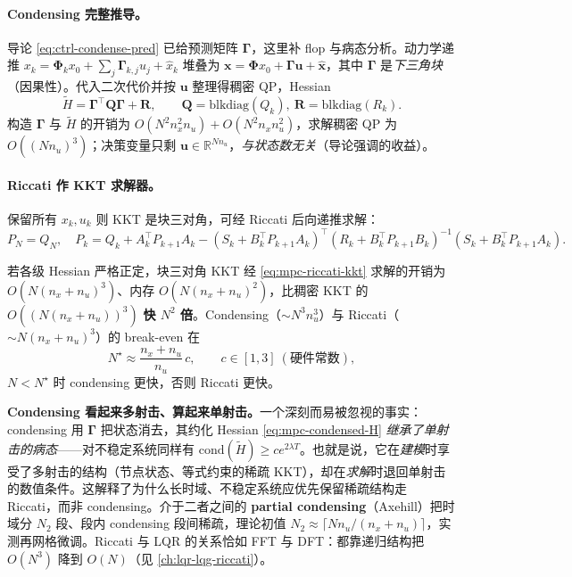 \paragraph{Condensing 完整推导。}
导论 \cref{eq:ctrl-condense-pred} 已给预测矩阵 $\boldsymbol\Gamma$，这里补 flop 与病态分析。动力学递推 $x_k=\boldsymbol\Phi_kx_0+\sum_j\boldsymbol\Gamma_{k,j}u_j+\hat x_k$ 堆叠为 $\mathbf x=\boldsymbol\Phi x_0+\boldsymbol\Gamma\mathbf u+\hat{\mathbf x}$，其中 $\boldsymbol\Gamma$ 是\emph{下三角块}（因果性）。代入二次代价并按 $\mathbf u$ 整理得稠密 QP，Hessian
\begin{equation}
  \tilde H=\boldsymbol\Gamma^\top\mathbf Q\boldsymbol\Gamma+\mathbf R,\qquad \mathbf Q=\mathrm{blkdiag}(Q_k),\ \mathbf R=\mathrm{blkdiag}(R_k).
  \label{eq:mpc-condensed-H}
\end{equation}
构造 $\boldsymbol\Gamma$ 与 $\tilde H$ 的开销为 $O(N^2n_x^2n_u)+O(N^2n_xn_u^2)$，求解稠密 QP 为 $O((Nn_u)^3)$；决策变量只剩 $\mathbf u\in\mathbb R^{Nn_u}$，\emph{与状态数无关}（导论强调的收益）。

\paragraph{Riccati 作 KKT 求解器。}
保留所有 $x_k,u_k$ 则 KKT 是块三对角，可经 Riccati 后向递推求解：
\begin{equation}
  P_N=Q_N,\quad P_k=Q_k+A_k^\top P_{k+1}A_k-(S_k+B_k^\top P_{k+1}A_k)^\top(R_k+B_k^\top P_{k+1}B_k)^{-1}(S_k+B_k^\top P_{k+1}A_k).
  \label{eq:mpc-riccati-kkt}
\end{equation}

\begin{theorem}
\label{thm:mpc-riccati}
若各级 Hessian 严格正定，块三对角 KKT 经 \cref{eq:mpc-riccati-kkt} 求解的开销为 $O(N(n_x+n_u)^3)$、内存 $O(N(n_x+n_u)^2)$，比稠密 KKT 的 $O((N(n_x+n_u))^3)$ \textbf{快 $N^2$ 倍}。Condensing（$\sim N^3n_u^3$）与 Riccati（$\sim N(n_x+n_u)^3$）的 break-even 在
\begin{equation}
  N^\star\approx\frac{n_x+n_u}{n_u}\,c,\qquad c\in[1,3]\ (\text{硬件常数}),
  \label{eq:mpc-breakeven}
\end{equation}
$N<N^\star$ 时 condensing 更快，否则 Riccati 更快。
\end{theorem}

\begin{insight}
\textbf{Condensing 看起来多射击、算起来单射击。}\;一个深刻而易被忽视的事实：condensing 用 $\boldsymbol\Gamma$ 把状态消去，其约化 Hessian \cref{eq:mpc-condensed-H} \emph{继承了单射击的病态}——对不稳定系统同样有 $\mathrm{cond}(\tilde H)\ge ce^{2\lambda T}$。也就是说，它在\emph{建模}时享受了多射击的结构（节点状态、等式约束的稀疏 KKT），却在\emph{求解}时退回单射击的数值条件。这解释了为什么长时域、不稳定系统应优先保留稀疏结构走 Riccati，而非 condensing。介于二者之间的 \textbf{partial condensing}（Axehill）把时域分 $N_2$ 段、段内 condensing 段间稀疏，理论初值 $N_2\approx\lceil Nn_u/(n_x+n_u)\rceil$，实测再网格微调。Riccati 与 LQR 的关系恰如 FFT 与 DFT：都靠递归结构把 $O(N^3)$ 降到 $O(N)$（见 \cref{ch:lqr-lqg-riccati}）。
\end{insight}

